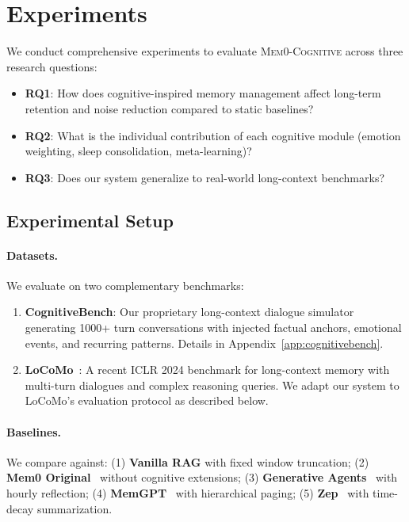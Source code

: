 \section{Experiments}
\label{sec:experiments}

We conduct comprehensive experiments to evaluate \textsc{Mem0-Cognitive} across three research questions:
\begin{itemize}
    \item \textbf{RQ1}: How does cognitive-inspired memory management affect long-term retention and noise reduction compared to static baselines?
    \item \textbf{RQ2}: What is the individual contribution of each cognitive module (emotion weighting, sleep consolidation, meta-learning)?
    \item \textbf{RQ3}: Does our system generalize to real-world long-context benchmarks?
\end{itemize}

\subsection{Experimental Setup}
\label{subsec:setup}

\paragraph{Datasets.} We evaluate on two complementary benchmarks:
\begin{enumerate}
    \item \textbf{CognitiveBench}: Our proprietary long-context dialogue simulator generating 1000+ turn conversations with injected factual anchors, emotional events, and recurring patterns. Details in Appendix~\ref{app:cognitivebench}.
    \item \textbf{LoCoMo}~\cite{locomo}: A recent ICLR 2024 benchmark for long-context memory with multi-turn dialogues and complex reasoning queries. We adapt our system to LoCoMo's evaluation protocol as described below.
\end{enumerate}

\paragraph{Baselines.} We compare against:
(1) \textbf{Vanilla RAG} with fixed window truncation;
(2) \textbf{Mem0 Original}~\cite{mem0} without cognitive extensions;
(3) \textbf{Generative Agents}~\cite{generative_agents} with hourly reflection;
(4) \textbf{MemGPT}~\cite{memgpt} with hierarchical paging;
(5) \textbf{Zep}~\cite{zep} with time-decay summarization.


